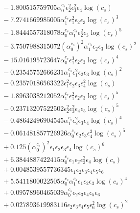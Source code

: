 \documentclass[10pt]{article}
\begin{document}
\begin{align*}
&{}  - 1.800515759705 \alpha_{0}^{c_s} \epsilon_{2}^{2} \epsilon_{3}^{2} \epsilon_{4} \log{\left(c_{s} \right)} \\
&{}  - 7.2741669985005 \alpha_{1}^{c_s} \epsilon_{1}^{2} \epsilon_{2} \epsilon_{3} \log{\left(c_{s} \right)}^{3} \\
&{}  - 1.8444557318078 \alpha_{0}^{c_s} \alpha_{1}^{c_s} \epsilon_{2}^{2} \epsilon_{3} \log{\left(c_{s} \right)}^{5} \\
&{}  - 3.7507988315072 \left(\alpha_{0}^{c_s}\right)^{2} \alpha_{1}^{c_s} \epsilon_{2} \epsilon_{3} \log{\left(c_{s} \right)}^{2} \\
&{}  - 15.016195723647 \alpha_{0}^{c_s} \epsilon_{1}^{3} \epsilon_{2} \epsilon_{3} \log{\left(c_{s} \right)}^{4} \\
&{}  - 0.23545752666231 \alpha_{1}^{c_s} \epsilon_{1}^{2} \epsilon_{2} \epsilon_{3} \log{\left(c_{s} \right)}^{2} \\
&{}  - 0.23570186563322 \epsilon_{1}^{2} \epsilon_{2} \epsilon_{3} \epsilon_{4}^{2} \log{\left(c_{s} \right)} \\
&{}  - 1.8963038212052 \alpha_{1}^{c_s} \epsilon_{1}^{2} \epsilon_{2} \epsilon_{3} \log{\left(c_{s} \right)}^{5} \\
&{}  - 0.23713207522502 \epsilon_{2}^{2} \epsilon_{3}^{2} \epsilon_{4} \epsilon_{5} \log{\left(c_{s} \right)}^{5} \\
&{}  - 0.48642496904545 \alpha_{1}^{c_s} \epsilon_{2}^{2} \epsilon_{3} \epsilon_{4} \log{\left(c_{s} \right)}^{4} \\
&{}  - 0.061481857726926 \alpha_{0}^{c_s} \epsilon_{2} \epsilon_{3} \epsilon_{4}^{3} \log{\left(c_{s} \right)}^{5} \\
&{}  + 0.125 \left(\alpha_{0}^{c_s}\right)^{2} \epsilon_{1} \epsilon_{2} \epsilon_{3} \epsilon_{4} \log{\left(c_{s} \right)}^{6} \\
&{}  + 6.3844887422415 \alpha_{0}^{c_s} \epsilon_{1} \epsilon_{2} \epsilon_{3}^{2} \epsilon_{4} \log{\left(c_{s} \right)} \\
&{}  + 0.0048539557736345 \epsilon_{1} \epsilon_{2} \epsilon_{3} \epsilon_{4} \epsilon_{5} \epsilon_{6} \\
&{}  + 5.5411800022505 \alpha_{0}^{c_s} \alpha_{1}^{c_s} \epsilon_{1} \epsilon_{2} \epsilon_{3} \log{\left(c_{s} \right)}^{4} \\
&{}  + 0.09578960465039 \alpha_{0}^{c_s} \epsilon_{2} \epsilon_{3} \epsilon_{4} \epsilon_{5} \epsilon_{6} \\
&{}  + 0.027893619983116 \epsilon_{2} \epsilon_{3} \epsilon_{4} \epsilon_{5} \epsilon_{6}^{2} \log{\left(c_{s} \right)}^{2} \\

\end{align*}
\end{document}
